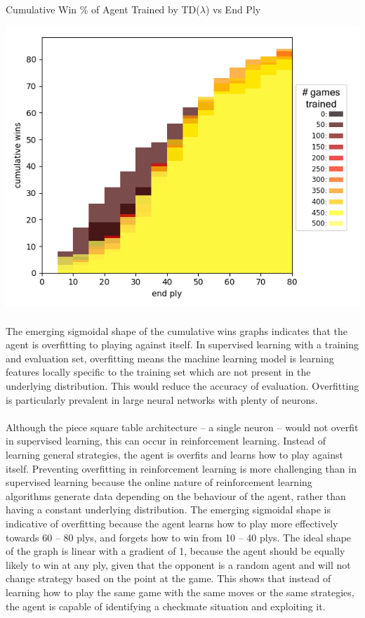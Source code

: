 \documentclass[12pt,a4paper]{book}
\begin{document}
\begin{center}
  \centerline{Cumulative Win \% of Agent Trained by TD($\lambda$) vs End Ply}
  \includegraphics[scale=0.5]{lambdahist2.png}
\end{center}

\paragraph{} The emerging sigmoidal shape of the cumulative wins graphs indicates that the agent is overfitting to playing against itself. In supervised learning with a training and evaluation set, overfitting means the machine learning model is learning features locally specific to the training set which are not present in the underlying distribution. This would reduce the accuracy of evaluation. Overfitting is particularly prevalent in large neural networks with plenty of neurons.

\paragraph{} Although the piece square table architecture -- a single neuron -- would not overfit in supervised learning, this can occur in reinforcement learning. Instead of learning general strategies, the agent is overfits and learns how to play against itself. Preventing overfitting in reinforcement learning is more challenging than in supervised learning because the online nature of reinforcement learning algorithms generate data depending on the behaviour of the agent, rather than having a constant underlying distribution. The emerging sigmoidal shape is indicative of overfitting because the agent learns how to play more effectively towards 60 -- 80 plys, and forgets how to win from 10 -- 40 plys. The ideal shape of the graph is linear with a gradient of 1, because the agent should be equally likely to win at any ply, given that the opponent is a random agent and will not change strategy based on the point at the game. This shows that instead of learning how to play the same game with the same moves or the same strategies, the agent is capable of identifying a checkmate situation and exploiting it. 
\end{document}
